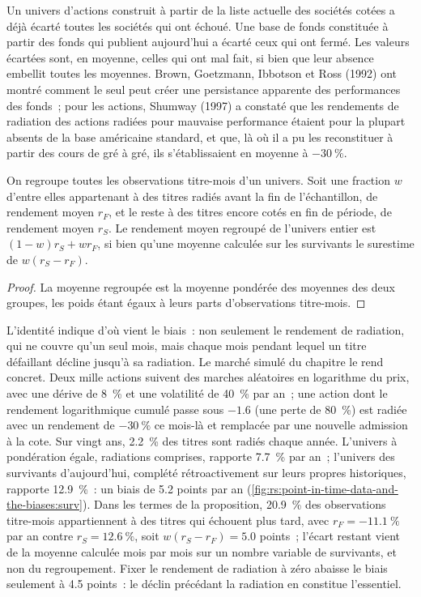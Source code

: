 Un univers d'actions construit à partir de la liste actuelle des sociétés cotées a déjà écarté toutes les sociétés qui ont échoué. Une base de
fonds constituée à partir des fonds qui publient aujourd'hui a écarté ceux qui ont fermé. Les valeurs écartées sont, en moyenne, celles qui
ont mal fait, si bien que leur absence embellit toutes les moyennes. Brown, Goetzmann, Ibbotson et Ross (1992) ont montré comment le seul  peut
créer une persistance apparente des performances des fonds~; pour les actions, Shumway (1997) a constaté que les rendements de radiation
des actions radiées pour mauvaise performance étaient pour la plupart absents de la base américaine standard, et que, là où il a pu les reconstituer
à partir des cours de gré à gré, ils s'établissaient en moyenne à $-30~\%$.

\begin{proposition}\label{prop:rs:point-in-time-data-and-the-biases:survivors}
On regroupe toutes les observations titre-mois d'un univers. Soit une fraction $w$ d'entre elles appartenant à des titres radiés avant la
fin de l'échantillon, de rendement moyen $r_F$, et le reste à des titres encore cotés en fin de période, de rendement moyen $r_S$. Le rendement moyen regroupé
de l'univers entier est $(1 - w)r_S + wr_F$, si bien qu'une moyenne calculée sur les survivants le surestime de $w(r_S - r_F)$.
\end{proposition}

\begin{proof}
La moyenne regroupée est la moyenne pondérée des moyennes des deux groupes, les poids étant égaux à leurs parts d'observations titre-mois.
\end{proof}

L'identité indique d'où vient le biais~: non seulement le rendement de radiation, qui ne couvre qu'un seul mois, mais chaque mois pendant lequel un titre défaillant
décline jusqu'à sa radiation. Le marché simulé du chapitre le rend concret. Deux mille actions suivent des marches aléatoires
en logarithme du prix, avec une dérive de 8~\% et une volatilité de 40~\% par an~; une action dont le rendement logarithmique cumulé passe sous $-1.6$ (une perte de
80~\%) est radiée avec un rendement de $-30~\%$ ce mois-là et remplacée par une nouvelle admission à la cote. Sur vingt ans, 2.2~\% des titres sont radiés
chaque année. L'univers à pondération égale, radiations comprises, rapporte 7.7~\% par an~; l'univers des survivants d'aujourd'hui,
complété rétroactivement sur leurs propres historiques, rapporte 12.9~\%~: un biais de 5.2 points par an
(\cref{fig:rs:point-in-time-data-and-the-biases:surv}). Dans les termes de la proposition, 20.9~\% des observations titre-mois appartiennent à des titres
qui échouent plus tard, avec $r_F = -11.1~\%$ par an contre $r_S = 12.6~\%$, soit $w(r_S - r_F) = 5.0$ points~; l'écart restant
vient de la moyenne calculée mois par mois sur un nombre variable de survivants, et non du regroupement. Fixer le rendement de radiation
à zéro abaisse le biais seulement à 4.5 points~: le déclin précédant la radiation en constitue l'essentiel.

